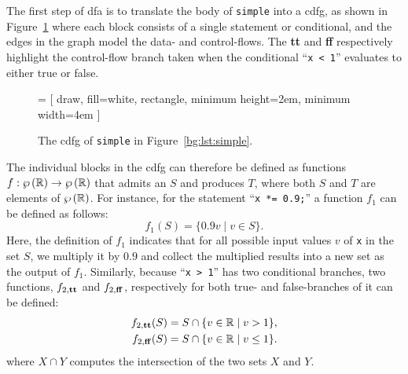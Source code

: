 The first step of \gls{dfa} is to translate the body of \verb|simple| into a
\gls{cdfg}, as shown in Figure~\ref{bg:fig:cdfg} where each block consists of
a single statement or conditional, and the edges in the graph model the data-
and control-flows.  The \textbf{tt} and \textbf{ff} respectively highlight
the control-flow branch taken when the conditional \mbox{``\texttt{x < 1}''}
evaluates to either true or false.
\begin{figure}[ht]
    \centering
     = [
        draw,
        fill=white,
        rectangle,
        minimum height=2em,
        minimum width=4em
    ]
    \caption{%
        The \gls{cdfg} of \texttt{simple} in Figure~\ref{bg:lst:simple}.
    }\label{bg:fig:cdfg}
\end{figure}

The individual blocks in the \gls{cdfg} can therefore be defined as functions
$f: \wp\left({\mathbb{R}}\right) \to \wp\left({\mathbb{R}}\right)$ that admits an $S$ and
produces $T$, where both $S$ and $T$ are elements of $\wp\left({\mathbb{R}}\right)$.
For instance, for the statement ``\texttt{x *= 0.9;}'' a function $f_1$ can be
defined as follows:
\begin{equation}
    f_1(S) = \{ 0.9 v \mid v \in S \}.
\end{equation}
Here, the definition of $f_1$ indicates that for all possible input values
$v$ of \verb|x| in the set $S$, we multiply it by $0.9$ and collect the
multiplied results into a new set as the output of $f_1$.  Similarly, because
\mbox{``\texttt{x > 1}''} has two conditional branches, two functions,
$f_{2,\mathbf{tt}}$ and $f_{2, \mathbf{ff}}$, respectively for both true- and
false-branches of it can be defined:
\begin{equation}
    \begin{aligned}
        f_{2, \mathbf{tt}}(S) &= S \cap \{ v \in \mathbb{R} \mid v > 1 \}, \\
        f_{2, \mathbf{ff}}(S) &= S \cap \{ v \in \mathbb{R} \mid v \leq 1 \}.
    \end{aligned}
\end{equation}
where $X \cap Y$ computes the intersection of the two sets $X$ and $Y$.

